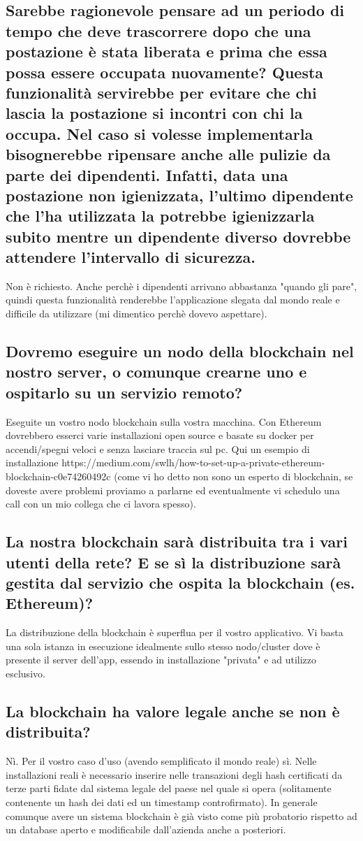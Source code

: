 \subsection{Sarebbe ragionevole pensare ad un periodo di tempo che deve trascorrere dopo che una postazione è stata liberata e prima che essa possa essere occupata nuovamente? Questa funzionalità servirebbe per evitare che chi lascia la postazione si incontri con chi la occupa. Nel caso si volesse implementarla bisognerebbe ripensare anche alle pulizie da parte dei dipendenti. Infatti, data una postazione non igienizzata, l'ultimo dipendente che l'ha utilizzata la potrebbe igienizzarla subito mentre un dipendente diverso dovrebbe attendere l'intervallo di sicurezza. }

Non è richiesto. Anche perchè i dipendenti arrivano abbastanza "quando gli pare", quindi questa funzionalità renderebbe l'applicazione slegata dal mondo reale e difficile da utilizzare (mi dimentico perchè dovevo aspettare).

\subsection{Dovremo eseguire un nodo della blockchain nel nostro server, o comunque crearne uno e ospitarlo su un servizio remoto?}

Eseguite un vostro nodo blockchain sulla vostra macchina. Con Ethereum dovrebbero esserci varie installazioni open source e basate su docker per accendi/spegni veloci e senza lasciare traccia sul pc. Qui un esempio di installazione https://medium.com/swlh/how-to-set-up-a-private-ethereum-blockchain-c0e74260492c (come vi ho detto non sono un esperto di blockchain, se doveste avere problemi proviamo a parlarne ed eventualmente vi schedulo una call con un mio collega che ci lavora spesso).

\subsection{La nostra blockchain sarà distribuita tra i vari utenti della rete? E se sì la distribuzione sarà gestita dal servizio che ospita la blockchain (es. Ethereum)?  }

La distribuzione della blockchain è superflua per il vostro applicativo. Vi basta una sola istanza in esecuzione idealmente sullo stesso nodo/cluster dove è presente il server dell'app, essendo in installazione "privata" e ad utilizzo esclusivo.

\subsection{La blockchain ha valore legale anche se non è distribuita?}

Nì. Per il vostro caso d'uso (avendo semplificato il mondo reale) sì. Nelle installazioni reali è necessario inserire nelle transazioni degli hash certificati da terze parti fidate dal sistema legale del paese nel quale si opera (solitamente contenente un hash dei dati ed un timestamp controfirmato). In generale comunque avere un sistema blockchain è già visto come più probatorio rispetto ad un database aperto e modificabile dall'azienda anche a posteriori.